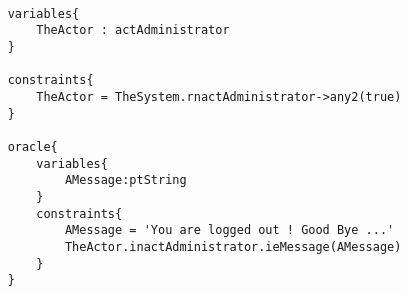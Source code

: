 	\scriptsize
	\vspace{0.5cm}
	\begin{lstlisting}[style=MessirStyle,firstnumber=auto,captionpos=b,caption={\msrmessir (MCL-oriented) specification of the test step \emph{testcase01-ts05oeLogout}.},label=TM-testcase01-ts05oeLogout-MCL-LST]

	variables{
		TheActor : actAdministrator
	}
	
	constraints{
		TheActor = TheSystem.rnactAdministrator->any2(true)
	}
	
	oracle{
		variables{
			AMessage:ptString
		}
		constraints{
			AMessage = 'You are logged out ! Good Bye ...'
			TheActor.inactAdministrator.ieMessage(AMessage)
		}
	}
	
	\end{lstlisting}
	\normalsize 
	
	
